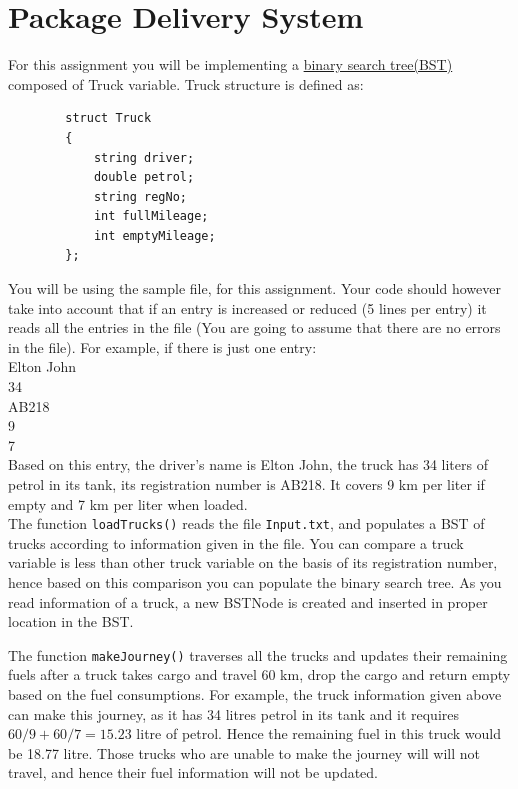 \documentclass[a4paper,12pt]{article}
\begin{document}
	
	\section{Package Delivery System}
	For this assignment you will be implementing a \href{https://www.javatpoint.com/binary-search-tree}{binary search tree(BST)} composed of Truck variable. Truck structure is defined as:

	\begin{lstlisting}
		struct Truck
		{
		    string driver;
		    double petrol;
		    string regNo;
		    int fullMileage;
		    int emptyMileage;
		};
	\end{lstlisting}

You will be using the sample file,  for this assignment. Your code should however take into account that if an entry is increased or reduced (5 lines per entry) it reads all the entries in the file (You are going to assume that there are no errors in the file). For example, if there is just one entry:\smallskip\\
	
	\noindent Elton John\\
	34\\
	AB218\\
	9\\
	7\\
	
	

	\noindent Based on this entry, the driver's name is Elton John, the truck has 34 liters of petrol in its tank, its registration number is AB218. It covers 9 km per liter if empty and 7 km per liter when loaded.\\
	
	\noindent The function \texttt{loadTrucks()} reads the file \texttt{Input.txt}, and populates a BST of trucks according to information given in the file. You can compare a truck variable is less than other truck variable on the basis of its registration number, hence based on this comparison you can populate the binary search tree. As you read information of a truck, a new BSTNode is created and inserted in proper location in the BST. 
	
	\noindent The function \texttt{makeJourney()} traverses all the trucks and updates their remaining fuels after a truck takes cargo and travel 60 km, drop the cargo and return empty based on the fuel consumptions. For example, the truck information given above can make this journey, as it has 34 litres petrol in its tank and it requires  $60/9 + 60/7 = 15.23$ litre of petrol. Hence the remaining fuel in this truck would be 18.77 litre. Those trucks who are unable to make the journey will will not travel, and hence their fuel information will not be updated. \\
\end{document}
